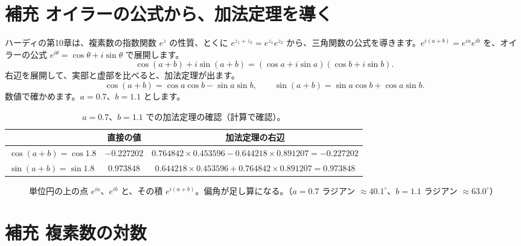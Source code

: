 \documentclass[a4paper,11pt,openany]{ltjsbook}
\begin{document}
\section{補充 オイラーの公式から、加法定理を導く}

ハーディの第10章は、複素数の指数関数 $e^{z}$ の性質、とくに $e^{z_1+z_2}=e^{z_1}e^{z_2}$ から、三角関数の公式を導きます。$e^{i(a+b)}=e^{ia}e^{ib}$ を、オイラーの公式 $e^{i\theta}=\cos\theta+i\sin\theta$ で展開します。
\[
\cos(a+b)+i\sin(a+b)=(\cos a+i\sin a)(\cos b+i\sin b).
\]
右辺を展開して、実部と虚部を比べると、加法定理が出ます。
\[
\cos(a+b)=\cos a\cos b-\sin a\sin b,\qquad\sin(a+b)=\sin a\cos b+\cos a\sin b .
\]
数値で確かめます。$a=0.7$、$b=1.1$ とします。

\begin{table}[htbp]
\centering
\begin{tabular}{lcc}
\toprule
 & 直接の値 & 加法定理の右辺\\
\midrule
$\cos(a+b)=\cos1.8$ & $-0.227202$ & $0.764842\times0.453596-0.644218\times0.891207=-0.227202$\\
$\sin(a+b)=\sin1.8$ & $0.973848$ & $0.644218\times0.453596+0.764842\times0.891207=0.973848$\\
\bottomrule
\end{tabular}
\caption{$a=0.7$、$b=1.1$ での加法定理の確認（計算で確認）。}
\end{table}

\begin{figure}[htbp]
\centering
{}
\caption{単位円の上の点 $e^{ia}$、$e^{ib}$ と、その積 $e^{i(a+b)}$。偏角が足し算になる。（$a=0.7$ ラジアン $\approx40.1^\circ$、$b=1.1$ ラジアン $\approx63.0^\circ$）}
\end{figure}

\section{補充 複素数の対数}
\end{document}
